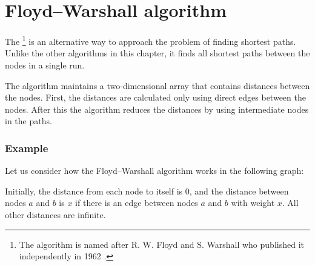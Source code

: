 \section{Floyd–Warshall algorithm}


The \footnote{The algorithm
is named after R. W. Floyd and S. Warshall
who published it independently in 1962 \cite{flo62,war62}.}
is an alternative way to approach the problem
of finding shortest paths.
Unlike the other algorithms in this chapter,
it finds all shortest paths between the nodes
in a single run.

The algorithm maintains a two-dimensional array
that contains distances between the nodes.
First, the distances are calculated only using
direct edges between the nodes.
After this the algorithm reduces the distances
by using intermediate nodes in the paths.

\subsubsection{Example}

Let us consider how the Floyd–Warshall algorithm
works in the following graph:

\begin{center}
\end{center}

Initially, the distance from each node to itself is $0$,
and the distance between nodes $a$ and $b$ is $x$
if there is an edge between nodes $a$ and $b$ with weight $x$.
All other distances are infinite.

